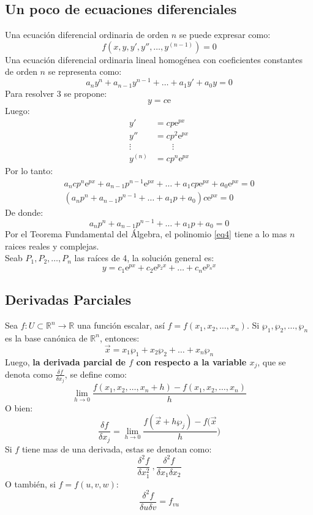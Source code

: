 \documentclass[a4paper]{article}
\newcommand{\euler}{\mathrm{e}}
\begin{document}
\subsection{Un poco de ecuaciones diferenciales}
Una ecuación diferencial ordinaria de orden $n$ se puede expresar como:
\[f(x,y,y',y'',\ldots,y^{(n-1)})=0\]
Una ecuación diferencial ordinaria lineal homogénea con coeficientes constantes de orden $n$ se representa como:
\begin{equation}
a_ny^n+a_{n-1}y^{n-1}+\ldots+a_1y'+a_0y=0
\end{equation}
Para resolver 3 se propone:
\[y=c\euler\]
Luego:
\begin{align*}
y'&=cp\euler^{px}\\
y''&=cp^2\euler^{px}\\
\vdots&\hspace{2em}\vdots\\
y^{(n)}&=cp^n\euler^{px}
\end{align*}
Por lo tanto:
\begin{gather*}
a_ncp^n\euler^{px}+a_{n-1}p^{n-1}\euler^{px}+\ldots+a_1cp\euler^{px}+a_0\euler^{px}=0\\
(a_np^n+a_{n-1}p^{n-1}+\ldots +a_1p+a_0)c\euler^{px}=0
\end{gather*}
De donde:
\begin{equation}
\label{eq4}
a_np^n+a_{n-1}p^{n-1}+\ldots+a_1p+a_0=0
\end{equation}
Por el Teorema Fundamental del Álgebra, el polinomio \ref{eq4} tiene a lo mas $n$ raices reales y complejas.\\
Seab $P_1,P_2,\ldots,P_n$ las raíces de 4, la solución general es:
\[y=c_1\euler^{px}+c_2\euler^{p_2x}+\ldots+c_n\euler^{p_{n}x}\]
\subsection{Derivadas Parciales}
Sea $f:U\subset\mathbb{R}^n\longrightarrow\mathbb{R}$ una función escalar, así $f=f(x_1,x_2,\ldots,x_n)$. Si ${\wp_1,\wp_2,\ldots,\wp_n}$ es la base canónica de $\mathbb{R}^n$, entonces:
\[\vec{x}=x_1\wp_1+x_2\wp_2+\ldots+x_n\wp_n\]
Luego, \textbf{la derivada parcial de $f$ con respecto a la variable $x_j$}, que se denota como $\frac{\delta f}{\delta x_j}$, se define como:
\[\lim_{h\rightarrow 0} \frac{f(x_1,x_2,\ldots,x_n+h)-f(x_1,x_2,\ldots,x_n)}{h}\]
O bien:
\[\frac{\delta f}{\delta x_j}=\lim_{h\rightarrow 0}\frac{f(\vec{x}+h\wp_j)-f(\vec{x}}{h})\]
Si $f$ tiene mas de una derivada, estas se denotan como:
\[\frac{\delta^2 f}{\delta x_1^2}\ ,\frac{\delta^2 f}{\delta x_1 \delta x_2}\]
O también, si $f=f(u,v,w)$:
\[\frac{\delta^2 f}{\delta u \delta v}=f_{vu}\]
\end{document}
